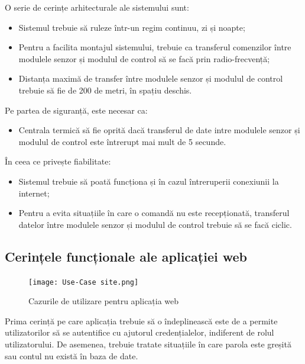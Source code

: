 	O serie de cerințe arhitecturale ale sistemului sunt:
	\begin{itemize}
		\setlength{\itemindent}{2em}
		\itemsep0em
		\item Sistemul trebuie să ruleze într-un regim continuu, zi și noapte;
		\item Pentru a facilita montajul sistemului, trebuie ca transferul comenzilor între modulele senzor și modulul de control să se facă prin radio-frecvență;
		\item Distanța maximă de transfer între modulele senzor și modulul de control trebuie să fie de 200 de metri, în spațiu deschis. 
	\end{itemize} 

\vspace{1em}

	Pe partea de siguranță, este necesar ca:
	\begin{itemize}
		\setlength{\itemindent}{2em}
		\itemsep0em
		\item Centrala termică să fie oprită dacă transferul de date intre modulele senzor și modulul de control este întrerupt mai mult de 5 secunde.
	\end{itemize}
	
\vspace{1em}

	În ceea ce privește fiabilitate:
	\begin{itemize}
		\setlength{\itemindent}{2em}
		\itemsep0em
		\item Sistemul trebuie să poată funcționa și în cazul întreruperii conexiunii la internet;
		\item Pentru a evita situațiile în care o comandă nu este recepționată, transferul datelor între modulele senzor și modulul de control trebuie să se facă ciclic.
	\end{itemize}

\subsection{Cerințele funcționale ale aplicației web}

\begin{figure}[H]
   	\centering
    	\texttt{[image: Use-Case site.png]}
	\caption{Cazurile de utilizare pentru aplicația web}
\end{figure}
	
	Prima cerință pe care aplicația trebuie să o îndeplinească este de a permite utilizatorilor să se autentifice cu ajutorul credențialelor, indiferent de rolul utilizatorului. De asemenea, trebuie tratate situațiile în care parola este greșită sau contul nu există în baza de date.

